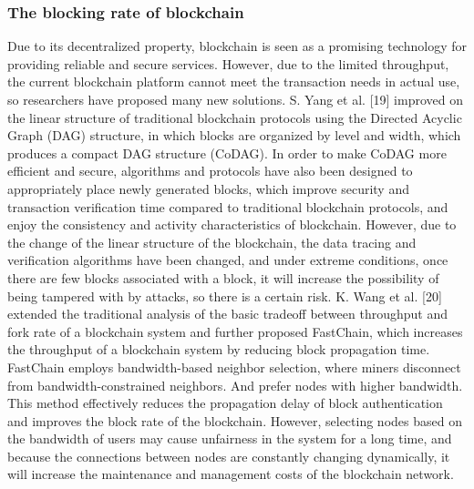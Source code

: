 \documentclass[lettersize,journal]{IEEEtran}
\begin{document}
\subsubsection{The blocking rate of blockchain}
Due to its decentralized property, blockchain is seen as a promising technology for providing reliable and secure services. However, due to the limited throughput, the current blockchain platform cannot meet the transaction needs in actual use, so researchers have proposed many new solutions. S. Yang et al. [19] improved on the linear structure of traditional blockchain protocols using the Directed Acyclic Graph (DAG) structure, in which blocks are organized by level and width, which produces a compact DAG structure (CoDAG). In order to make CoDAG more efficient and secure, algorithms and protocols have also been designed to appropriately place newly generated blocks, which improve security and transaction verification time compared to traditional blockchain protocols, and enjoy the consistency and activity characteristics of blockchain. However, due to the change of the linear structure of the blockchain, the data tracing and verification algorithms have been changed, and under extreme conditions, once there are few blocks associated with a block, it will increase the possibility of being tampered with by attacks, so there is a certain risk. K. Wang et al. [20] extended the traditional analysis of the basic tradeoff between throughput and fork rate of a blockchain system and further proposed FastChain, which increases the throughput of a blockchain system by reducing block propagation time. FastChain employs bandwidth-based neighbor selection, where miners disconnect from bandwidth-constrained neighbors. And prefer nodes with higher bandwidth. This method effectively reduces the propagation delay of block authentication and improves the block rate of the blockchain. However, selecting nodes based on the bandwidth of users may cause unfairness in the system for a long time, and because the connections between nodes are constantly changing dynamically, it will increase the maintenance and management costs of the blockchain network. 
\end{document}
